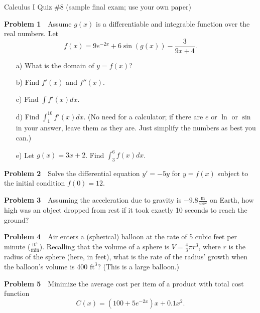 \documentclass[10pt]{article}
\begin{document}


\begin{center}
Calculus I Quiz \#8 (sample final exam; use your own paper)
\end{center}


\noindent\textbf{Problem 1} \,\, Assume $g(x)$ is a differentiable and integrable function over the real numbers. Let 
\[ f(x) = 9e^{-2x} + 6 \sin( g(x) ) - \frac{3}{9x+4}.\]

\begin{itemize}
\item[a) ] What is the domain of $y=f(x)$?
\item[b) ] Find $f'(x)$ and $f''(x)$.
\item[c) ] Find $\int f'(x) dx$.
\item[d) ] Find $\int_{1}^{10} f'(x) dx$. (No need for a calculator; if there are $e$ or $\ln$ or $\sin$ in your answer, leave them as they are. Just simplify the numbers as best you can.)
\item[e) ] Let $g(x) = 3x + 2$. Find $\int_{3}^{6} f(x) dx$.
\end{itemize}

\vspace{5mm}

\noindent\textbf{Problem 2} \,\, Solve the differential equation $y' = -5y$ for $y = f(x)$ subject to the initial condition $f(0) = 12$.

\vspace{5mm}

\noindent\textbf{Problem 3} \,\, Assuming the acceleration due to gravity is $-9.8 \frac{\text{m}}{\text{sec}^2}$ on Earth, how high was an object dropped from rest if it took exactly 10 seconds to reach the ground?

\vspace{5mm}

\noindent\textbf{Problem 4} \,\, Air enters a (spherical) balloon at the rate of 5 cubic feet per minute ($\frac{\text{ft}^3}{\text{min}}$). Recalling that the volume of a sphere is $V = \frac{4}{3} \pi r^3$, where $r$ is the radius of the sphere (here, in feet), what is the rate of the radius' growth when the balloon's volume is 400 $\text{ft}^3$? (This is a large balloon.)

\vspace{5mm}

\noindent\textbf{Problem 5} \,\, Minimize the average cost per item of a product with total cost function 
\[ C(x) = (100 + 5e^{-2x})x + 0.1x^2. \]
\end{document}
